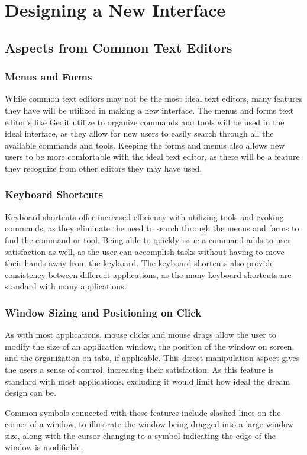 \documentclass[11pt, oneside]{article}
\begin{document}
\section{Designing a New Interface}
\subsection{Aspects from Common Text Editors}
\subsubsection{Menus and Forms}
While common text editors may not be the most ideal text editors, many features they have will be utilized in making a new interface. The menus and forms text editor's like Gedit utilize to organize commands and tools will be used in the ideal interface, as they allow for new users to easily search through all the available commands and tools. Keeping the forms and menus also allows new users to be more comfortable with the ideal text editor, as there will be a feature they recognize from other editors they may have used. 

\subsubsection{Keyboard Shortcuts}
Keyboard shortcuts offer increased efficiency with utilizing tools and evoking commands, as they eliminate the need to search through the menus and forms to find the command or tool. Being able to quickly issue a command adds to user satisfaction as well, as the user can accomplish tasks without having to move their hands away from the keyboard. The keyboard shortcuts also provide consistency between different applications, as the many keyboard shortcuts are standard with many applications.

\subsubsection{Window Sizing and Positioning on Click}
As with most applications, mouse clicks and mouse drags allow the user to modify the size of an application window, the position of the window on screen, and the organization on tabs, if applicable. This direct manipulation aspect gives the users a sense of control, increasing their satisfaction. As this feature is standard with most applications, excluding it would limit how ideal the dream design can be.

Common symbols connected with these features include slashed lines on the corner of a window, to illustrate the window being dragged into a large window size, along with the cursor changing to a symbol indicating the edge of the window is modifiable. 
\end{document}
